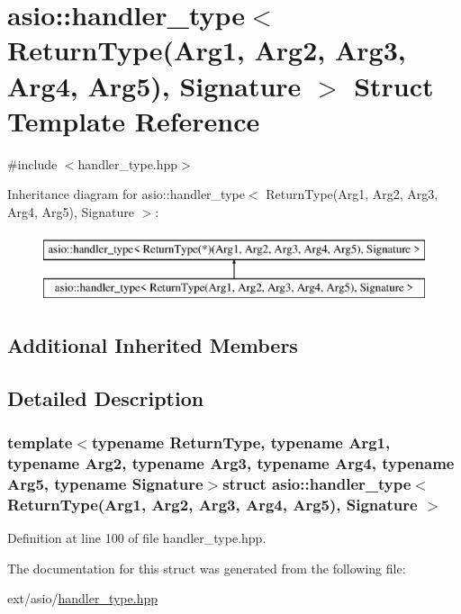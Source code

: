 \hypertarget{structasio_1_1handler__type_3_01_return_type_07_arg1_00_01_arg2_00_01_arg3_00_01_arg4_00_01_arg5_08_00_01_signature_01_4}{}\section{asio\+:\+:handler\+\_\+type$<$ Return\+Type(Arg1, Arg2, Arg3, Arg4, Arg5), Signature $>$ Struct Template Reference}
\label{structasio_1_1handler__type_3_01_return_type_07_arg1_00_01_arg2_00_01_arg3_00_01_arg4_00_01_arg5_08_00_01_signature_01_4}


{\ttfamily \#include $<$handler\+\_\+type.\+hpp$>$}

Inheritance diagram for asio\+:\+:handler\+\_\+type$<$ Return\+Type(Arg1, Arg2, Arg3, Arg4, Arg5), Signature $>$\+:\begin{figure}[H]
\begin{center}
\leavevmode
\includegraphics[height=2.000000cm]{structasio_1_1handler__type_3_01_return_type_07_arg1_00_01_arg2_00_01_arg3_00_01_arg4_00_01_arg5_08_00_01_signature_01_4}
\end{center}
\end{figure}
\subsection*{Additional Inherited Members}


\subsection{Detailed Description}
\subsubsection*{template$<$typename Return\+Type, typename Arg1, typename Arg2, typename Arg3, typename Arg4, typename Arg5, typename Signature$>$struct asio\+::handler\+\_\+type$<$ Return\+Type(\+Arg1, Arg2, Arg3, Arg4, Arg5), Signature $>$}



Definition at line 100 of file handler\+\_\+type.\+hpp.



The documentation for this struct was generated from the following file\+:\begin{DoxyCompactItemize}
\item 
ext/asio/\hyperlink{handler__type_8hpp}{handler\+\_\+type.\+hpp}\end{DoxyCompactItemize}
